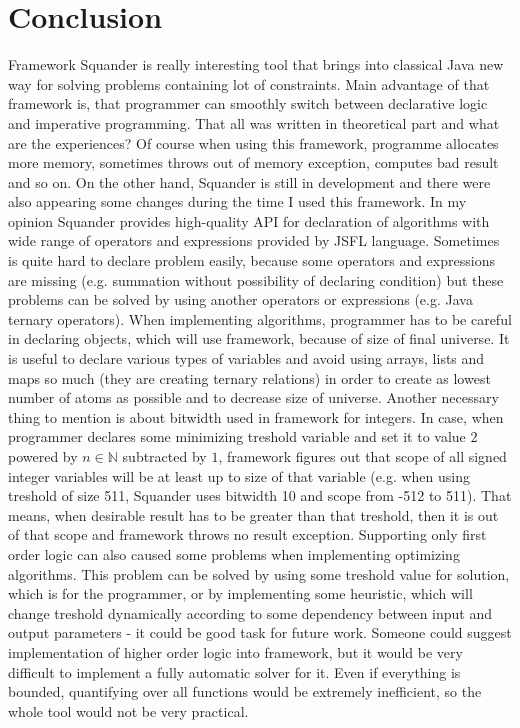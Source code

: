 \documentclass[11pt,twoside,a4paper]{book}
\begin{document}

\chapter{Conclusion}

Framework Squander is really interesting tool that brings into classical Java
new way for solving problems containing lot of constraints. Main
advantage of that framework is, that programmer can smoothly switch between
declarative logic and imperative programming. That all was written in
theoretical part and what are the experiences? Of course when using this framework,
programme allocates more memory, sometimes throws out of memory exception,
computes bad result and so on. On the other hand, Squander is still in
development and there were also appearing some changes during the time I used
this framework.
In my opinion Squander provides high-quality API for declaration of algorithms
with wide range of operators and expressions provided by JSFL language. Sometimes is
quite hard to declare problem easily, because some operators and expressions are missing
(e.g. summation without possibility of declaring condition) but these problems
can be solved by using another operators or expressions (e.g. Java ternary
operators). When implementing algorithms, programmer has to be careful in
declaring objects, which will use framework, because of size of final universe.
It is useful to declare various types of variables and avoid using arrays, lists
and maps so much (they are creating ternary relations) in order to create as
lowest number of atoms as possible and to decrease size of universe. Another
necessary thing to mention is about bitwidth used in framework for integers. In
case, when programmer declares some minimizing treshold variable and set it to
value $2$ powered by $n\in\mathbb{N}$ subtracted by $1$, framework figures out that
scope of all signed integer variables will be at least up to size of that
variable (e.g. when using treshold of size 511, Squander uses bitwidth 10 and
scope from -512 to 511). That means, when desirable result
has to be greater than that treshold, then it is out of that scope and framework
throws no result exception. Supporting only first order logic can also caused some problems when
implementing optimizing algorithms. This problem can be solved by using some
treshold value for solution, which is  for the programmer, or by
implementing some heuristic, which will change treshold dynamically according to
some dependency between input and output parameters - it could be good task
for future work. Someone could suggest implementation of higher order logic into
framework, but it would be very difficult to implement a fully automatic solver
for it. Even if everything is bounded, quantifying over all functions would be
extremely inefficient, so the whole tool would not be very practical.
\end{document}
